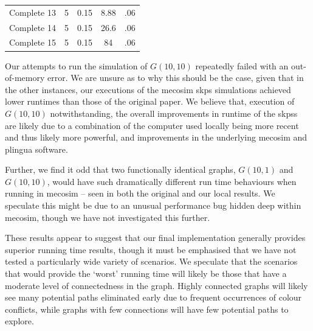 \begin{table}
\begin{tabular}{@{}lcccc@{}}
Complete 13 & 5                                                            & 0.15                                                           & 8.88 & .06                                                       \\
Complete 14 & 5                                                            & 0.15                                                           & 26.6 & .06                                                       \\
Complete 15 & 5                                                            & 0.15                                                           & 84   & .06                                                       \\ \bottomrule
\end{tabular}%
\end{table}

Our attempts to run the simulation of \(G(10,10)\) repeatedly failed with an out-of-memory error.  We are unsure as to why this should be the case, given that in the other instances, our executions of the \gls{mecosim} \gls{skps} simulations achieved lower runtimes than those of the original paper.  We believe that, execution of \(G(10,10)\) notwithstanding, the overall improvements in runtime of the \glspl{skps} are likely due to a combination of the computer used locally being more recent and thus likely more powerful, and improvements in the underlying \gls{mecosim} and \gls{plingua} software.

Further, we find it odd that two functionally identical graphs, \(G(10,1)\) and \(G(10,10)\), would have such dramatically different run time behaviours when running in \gls{mecosim} -- seen in both the original and our local results.  We speculate this might be due to an unusual performance bug hidden deep within \gls{mecosim}, though we have not investigated this further.

These results appear to suggest that our final implementation generally provides superior running time results, though it must be emphasised that we have not tested a particularly wide variety of scenarios.  We speculate that the scenarios that would provide the `worst' running time will likely be those that have a moderate level of connectedness in the graph.  Highly connected graphs will likely see many potential paths eliminated early due to frequent occurrences of colour conflicts, while graphs with few connections will have few potential paths to explore.

